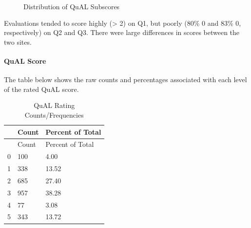 \documentclass[
  letterpaper,
  DIV=11,
  numbers=noendperiod]{scrartcl}
\let\oldparagraph\paragraph
\renewcommand{\paragraph}[1]{\oldparagraph{#1}\mbox{}}
\begin{document}
\begin{figure}
\begin{minipage}[t]{0.33\linewidth}
{\centering 


}

\end{minipage}%

\caption{\label{fig-distsubscores}Distribution of QuAL Subscores}

\end{figure}

Evaluations tended to score highly (\textgreater{} 2) on Q1, but poorly
(80\% 0 and 83\% 0, respectively) on Q2 and Q3. There were large
differences in scores between the two sites.

\hypertarget{qual-score-1}{%
\paragraph{QuAL Score}\label{qual-score-1}}

The table below shows the raw counts and percentages associated with
each level of the rated QuAL score.

\hypertarget{tbl-distqual}{}
\begin{longtable}[]{@{}lll@{}}
\caption{\label{tbl-distqual}QuAL Rating
Counts/Frequencies}\tabularnewline
\toprule()
& Count & Percent of Total \\
\midrule()
\endfirsthead
\toprule()
& Count & Percent of Total \\
\midrule()
\endhead
0 & 100 & 4.00 \\
1 & 338 & 13.52 \\
2 & 685 & 27.40 \\
3 & 957 & 38.28 \\
4 & 77 & 3.08 \\
5 & 343 & 13.72 \\
\bottomrule()
\end{longtable}
\end{document}
